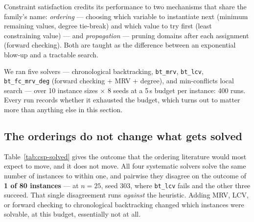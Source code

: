 Constraint satisfaction credits its performance to two mechanisms that share the family's name:
\emph{ordering} --- choosing which variable to instantiate next (minimum remaining values, degree
tie-break) and which value to try first (least constraining value) --- and \emph{propagation} ---
pruning domains after each assignment (forward checking). Both are taught as the difference between
an exponential blow-up and a tractable search.

We ran five solvers --- chronological backtracking, {\tt bt\_mrv}, {\tt bt\_lcv},
{\tt bt\_fc\_mrv\_deg} (forward checking + MRV + degree), and min-conflicts local search
\citep{minton1992minimizing} --- over 10 instance sizes $\times$ 8 seeds at a 5\,s budget per
instance: 400 runs. Every run records whether it exhausted the budget, which turns out to matter
more than anything else in this section.

\subsection{The orderings do not change what gets solved}

Table~\ref{tab:csp-solved} gives the outcome that the ordering literature would most expect to
move, and it does not move. All four systematic solvers solve the same number of instances to
within one, and pairwise they disagree on the outcome of \textbf{1 of 80 instances} --- at $n = 25$,
seed 303, where {\tt bt\_lcv} fails and the other three succeed. That single disagreement runs
\emph{against} the heuristic. Adding MRV, LCV, or forward checking to chronological backtracking
changed which instances were solvable, at this budget, essentially not at all.

